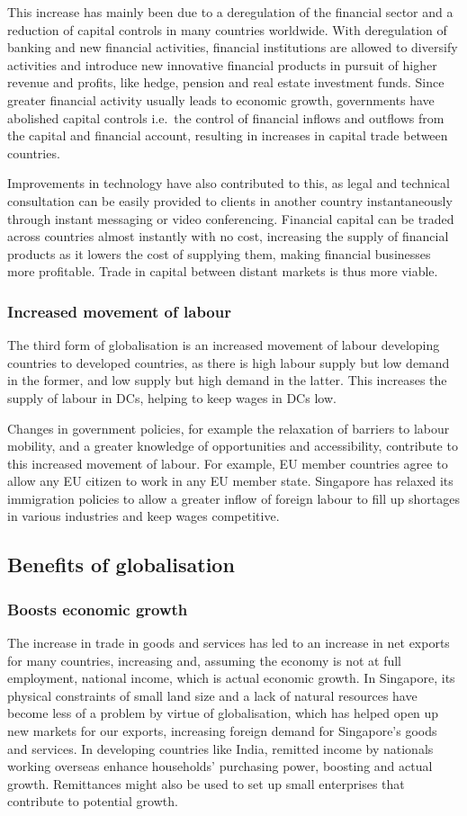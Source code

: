 \documentclass[Economics.tex]{subfiles}
\begin{document}
This increase has mainly been due to a deregulation of the financial sector and a reduction of capital controls in many countries worldwide. With deregulation of banking and new financial activities, financial institutions are allowed to diversify activities and introduce new innovative financial products in pursuit of higher revenue and profits, like hedge, pension and real estate investment funds. Since greater financial activity usually leads to economic growth, governments have abolished capital controls i.e.\ the control of financial inflows and outflows from the capital and financial account, resulting in increases in capital trade between countries.

Improvements in technology have also contributed to this, as legal and technical consultation can be easily provided to clients in another country instantaneously through instant messaging or video conferencing. Financial capital can be traded across countries almost instantly with no cost, increasing the supply of financial products as it lowers the cost of supplying them, making financial businesses more profitable. Trade in capital between distant markets is thus more viable.
\subsubsection{Increased movement of labour}
The third form of globalisation is an increased movement of labour developing countries to developed countries, as there is high labour supply but low demand in the former, and low supply but high demand in the latter. This increases the supply of labour in DCs, helping to keep wages in DCs low.

Changes in government policies, for example the relaxation of barriers to labour mobility, and a greater knowledge of opportunities and accessibility, contribute to this increased movement of labour. For example, EU member countries agree to allow any EU citizen to work in any EU member state. Singapore has relaxed its immigration policies to allow a greater inflow of foreign labour to fill up shortages in various industries and keep wages competitive.
\subsection{Benefits of globalisation}
\subsubsection{Boosts economic growth}
The increase in trade in goods and services has led to an increase in net exports for many countries, increasing \AD{} and, assuming the economy is not at full employment, national income, which is actual economic growth. In Singapore, its physical constraints of small land size and a lack of natural resources have become less of a problem by virtue of globalisation, which has helped open up new markets for our exports, increasing foreign demand for Singapore's goods and services. In developing countries like India, remitted income by nationals working overseas enhance households' purchasing power, boosting \AD{} and actual growth. Remittances might also be used to set up small enterprises that contribute to potential growth.
\end{document}
